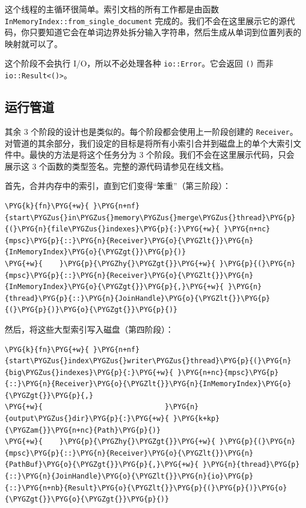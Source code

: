 这个线程的主循环很简单。索引文档的所有工作都是由函数 \texttt{InMemoryIndex::from\_single\_document} 完成的。我们不会在这里展示它的源代码，你只要知道它会在单词边界处拆分输入字符串，然后生成从单词到位置列表的映射就可以了。

这个阶段不会执行 I/O，所以不必处理各种 \texttt{io::Error}。它会返回 \texttt{()} 而非 \texttt{io::Result<()>}。

\subsection{运行管道}

其余 3 个阶段的设计也是类似的。每个阶段都会使用上一阶段创建的 \texttt{Receiver}。对管道的其余部分，我们设定的目标是将所有小索引合并到磁盘上的单个大索引文件中。最快的方法是将这个任务分为 3 个阶段。我们不会在这里展示代码，只会展示这 3 个函数的类型签名。完整的源代码请参见在线文档。

首先，合并内存中的索引，直到它们变得“笨重”（第三阶段）：

\begin{Verbatim}[commandchars=\\\{\},breaklines=true,breakanywhere=true,fontsize=\codefont,xleftmargin=17bp]
\PYG{k}{fn}\PYG{+w}{ }\PYG{n+nf}{start\PYGZus{}in\PYGZus{}memory\PYGZus{}merge\PYGZus{}thread}\PYG{p}{(}\PYG{n}{file\PYGZus{}indexes}\PYG{p}{:}\PYG{+w}{ }\PYG{n+nc}{mpsc}\PYG{p}{::}\PYG{n}{Receiver}\PYG{o}{\PYGZlt{}}\PYG{n}{InMemoryIndex}\PYG{o}{\PYGZgt{}}\PYG{p}{)}
\PYG{+w}{    }\PYG{p}{\PYGZhy{}\PYGZgt{}}\PYG{+w}{ }\PYG{p}{(}\PYG{n}{mpsc}\PYG{p}{::}\PYG{n}{Receiver}\PYG{o}{\PYGZlt{}}\PYG{n}{InMemoryIndex}\PYG{o}{\PYGZgt{}}\PYG{p}{,}\PYG{+w}{ }\PYG{n}{thread}\PYG{p}{::}\PYG{n}{JoinHandle}\PYG{o}{\PYGZlt{}}\PYG{p}{(}\PYG{p}{)}\PYG{o}{\PYGZgt{}}\PYG{p}{)}
\end{Verbatim}

然后，将这些大型索引写入磁盘（第四阶段）：

\begin{Verbatim}[commandchars=\\\{\},breaklines=true,breakanywhere=true,fontsize=\codefont,xleftmargin=17bp]
\PYG{k}{fn}\PYG{+w}{ }\PYG{n+nf}{start\PYGZus{}index\PYGZus{}writer\PYGZus{}thread}\PYG{p}{(}\PYG{n}{big\PYGZus{}indexes}\PYG{p}{:}\PYG{+w}{ }\PYG{n+nc}{mpsc}\PYG{p}{::}\PYG{n}{Receiver}\PYG{o}{\PYGZlt{}}\PYG{n}{InMemoryIndex}\PYG{o}{\PYGZgt{}}\PYG{p}{,}
\PYG{+w}{                             }\PYG{n}{output\PYGZus{}dir}\PYG{p}{:}\PYG{+w}{ }\PYG{k+kp}{\PYGZam{}}\PYG{n+nc}{Path}\PYG{p}{)}
\PYG{+w}{    }\PYG{p}{\PYGZhy{}\PYGZgt{}}\PYG{+w}{ }\PYG{p}{(}\PYG{n}{mpsc}\PYG{p}{::}\PYG{n}{Receiver}\PYG{o}{\PYGZlt{}}\PYG{n}{PathBuf}\PYG{o}{\PYGZgt{}}\PYG{p}{,}\PYG{+w}{ }\PYG{n}{thread}\PYG{p}{::}\PYG{n}{JoinHandle}\PYG{o}{\PYGZlt{}}\PYG{n}{io}\PYG{p}{::}\PYG{n+nb}{Result}\PYG{o}{\PYGZlt{}}\PYG{p}{(}\PYG{p}{)}\PYG{o}{\PYGZgt{}}\PYG{o}{\PYGZgt{}}\PYG{p}{)}
\end{Verbatim}

